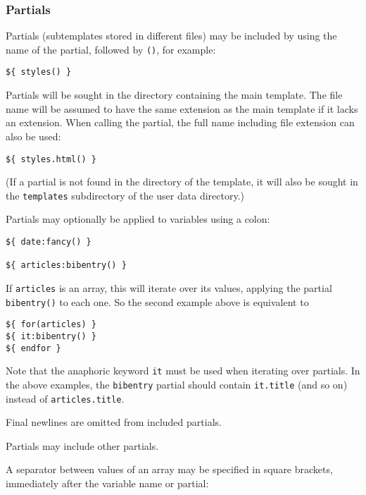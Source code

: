 \documentclass[]{article}
\begin{document}
\hypertarget{partials}{%
\subsubsection{Partials}\label{partials}}

Partials (subtemplates stored in different files) may be included by
using the name of the partial, followed by \texttt{()}, for example:

\begin{verbatim}
${ styles() }
\end{verbatim}

Partials will be sought in the directory containing the main template.
The file name will be assumed to have the same extension as the main
template if it lacks an extension. When calling the partial, the full
name including file extension can also be used:

\begin{verbatim}
${ styles.html() }
\end{verbatim}

(If a partial is not found in the directory of the template, it will
also be sought in the \texttt{templates} subdirectory of the user data
directory.)

Partials may optionally be applied to variables using a colon:

\begin{verbatim}
${ date:fancy() }

${ articles:bibentry() }
\end{verbatim}

If \texttt{articles} is an array, this will iterate over its values,
applying the partial \texttt{bibentry()} to each one. So the second
example above is equivalent to

\begin{verbatim}
${ for(articles) }
${ it:bibentry() }
${ endfor }
\end{verbatim}

Note that the anaphoric keyword \texttt{it} must be used when iterating
over partials. In the above examples, the \texttt{bibentry} partial
should contain \texttt{it.title} (and so on) instead of
\texttt{articles.title}.

Final newlines are omitted from included partials.

Partials may include other partials.

A separator between values of an array may be specified in square
brackets, immediately after the variable name or partial:
\end{document}
